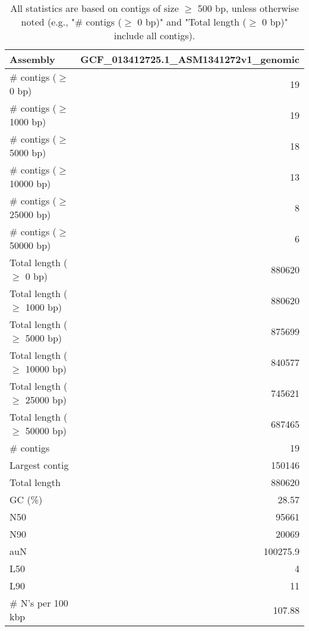 \documentclass[12pt,a4paper]{article}
\begin{document}
\begin{table}[ht]
\begin{center}
\caption{All statistics are based on contigs of size $\geq$ 500 bp, unless otherwise noted (e.g., "\# contigs ($\geq$ 0 bp)" and "Total length ($\geq$ 0 bp)" include all contigs).}
\begin{tabular}{|l*{1}{|r}|}
\hline
Assembly & GCF\_013412725.1\_ASM1341272v1\_genomic \\ \hline
\# contigs ($\geq$ 0 bp) & 19 \\ \hline
\# contigs ($\geq$ 1000 bp) & 19 \\ \hline
\# contigs ($\geq$ 5000 bp) & 18 \\ \hline
\# contigs ($\geq$ 10000 bp) & 13 \\ \hline
\# contigs ($\geq$ 25000 bp) & 8 \\ \hline
\# contigs ($\geq$ 50000 bp) & 6 \\ \hline
Total length ($\geq$ 0 bp) & 880620 \\ \hline
Total length ($\geq$ 1000 bp) & 880620 \\ \hline
Total length ($\geq$ 5000 bp) & 875699 \\ \hline
Total length ($\geq$ 10000 bp) & 840577 \\ \hline
Total length ($\geq$ 25000 bp) & 745621 \\ \hline
Total length ($\geq$ 50000 bp) & 687465 \\ \hline
\# contigs & 19 \\ \hline
Largest contig & 150146 \\ \hline
Total length & 880620 \\ \hline
GC (\%) & 28.57 \\ \hline
N50 & 95661 \\ \hline
N90 & 20069 \\ \hline
auN & 100275.9 \\ \hline
L50 & 4 \\ \hline
L90 & 11 \\ \hline
\# N's per 100 kbp & 107.88 \\ \hline
\end{tabular}
\end{center}
\end{table}
\end{document}
